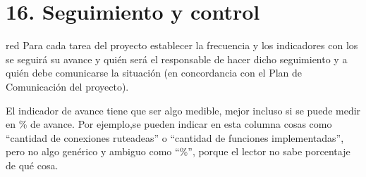 \documentclass[11pt]{charter}
\begin{document}
\pagebreak

\section{16. Seguimiento y control}
\label{sec:seguimiento}

\begin{consigna}{red}
Para cada tarea del proyecto establecer la frecuencia y los indicadores con los se seguirá su avance y quién será el responsable de hacer dicho seguimiento y a quién debe comunicarse la situación (en concordancia con el Plan de Comunicación del proyecto).

El indicador de avance tiene que ser algo medible, mejor incluso si se puede medir en \% de avance. Por ejemplo,se pueden indicar en esta columna cosas como ``cantidad de conexiones ruteadeas'' o ``cantidad de funciones implementadas'', pero no algo genérico y ambiguo como ``\%'', porque el lector no sabe porcentaje de qué cosa.

\end{consigna}
\end{document}
